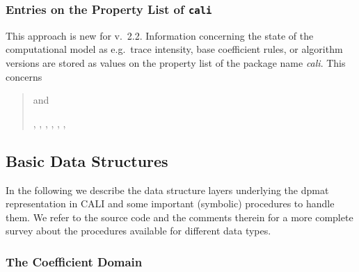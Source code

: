 \subsubsection*{Entries on the Property List of \texttt{cali}}

This approach is new for v.\ 2.2. Information concerning the state of
the computational model as e.g.\ trace intensity, base coefficient
rules, or algorithm versions are stored as values on the property list
of the package name \emph{cali}. This concerns
\begin{quote}
 and 










, , , ,
, , 

\end{quote}


\subsection{Basic Data Structures}

In the following we describe the data structure layers underlying the
dpmat representation in CALI and some important (symbolic) procedures
to handle them. We refer to the source code and the comments therein for
a more complete survey about the procedures available for different
data types.

\subsubsection{The Coefficient Domain}

